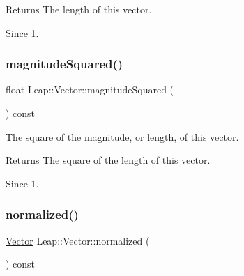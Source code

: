 \begin{DoxyCodeInclude}
\end{DoxyCodeInclude}


\begin{DoxyReturn}{Returns}
The length of this vector. 
\end{DoxyReturn}
\begin{DoxySince}{Since}
1. 
\end{DoxySince}
\mbox{\label{struct_leap_1_1_vector_ad45ef98121a5f8d26894da7bbe68e4e1}} 
\subsubsection{\texorpdfstring{magnitude\+Squared()}{magnitudeSquared()}}
{\footnotesize\ttfamily float Leap\+::\+Vector\+::magnitude\+Squared (\begin{DoxyParamCaption}{ }\end{DoxyParamCaption}) const\hspace{0.3cm}{\ttfamily [inline]}}

The square of the magnitude, or length, of this vector.


\begin{DoxyCodeInclude}
\end{DoxyCodeInclude}


\begin{DoxyReturn}{Returns}
The square of the length of this vector. 
\end{DoxyReturn}
\begin{DoxySince}{Since}
1. 
\end{DoxySince}
\mbox{\label{struct_leap_1_1_vector_a1e53e5841c03042cd1d19e360254a309}} 
\subsubsection{\texorpdfstring{normalized()}{normalized()}}
{\footnotesize\ttfamily \hyperlink{struct_leap_1_1_vector}{Vector} Leap\+::\+Vector\+::normalized (\begin{DoxyParamCaption}{ }\end{DoxyParamCaption}) const\hspace{0.3cm}{\ttfamily [inline]}}

